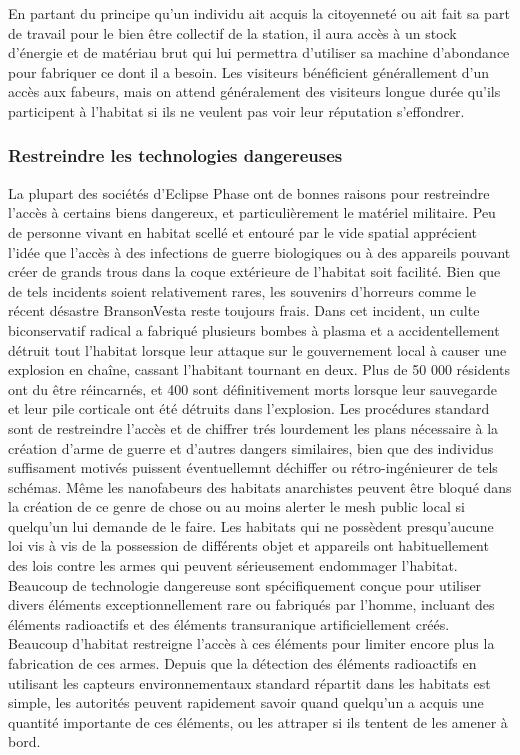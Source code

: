                En partant du principe qu'un individu ait acquis la citoyenneté ou ait fait sa part de travail pour le bien être collectif de la station, il aura accès à un stock d'énergie et de matériau brut qui lui permettra d'utiliser sa machine d'abondance pour fabriquer ce dont il a besoin. Les visiteurs bénéficient générallement d'un accès aux fabeurs, mais on attend généralement des visiteurs longue durée qu'ils participent à l'habitat si ils ne veulent pas voir leur réputation s'effondrer. 

               \subsubsection{Restreindre les technologies dangereuses} \label{sec:restr-dang-techn} 

               La plupart des sociétés d'Eclipse Phase ont de bonnes raisons pour restreindre l'accès à certains biens dangereux, et particulièrement le matériel militaire. Peu de personne vivant en habitat scellé et entouré par le vide spatial apprécient l'idée que l'accès à des infections de guerre biologiques ou à des appareils pouvant créer de grands trous dans la coque extérieure de l'habitat soit facilité. Bien que de tels incidents soient relativement rares, les souvenirs d'horreurs comme le récent désastre BransonVesta reste toujours frais. Dans cet incident, un culte biconservatif radical a fabriqué plusieurs bombes à plasma et a accidentellement détruit tout l'habitat lorsque leur attaque sur le gouvernement local à causer une explosion en chaîne, cassant l'habitant tournant en deux. Plus de 50 000 résidents ont du être réincarnés, et 400 sont définitivement morts lorsque leur sauvegarde et leur pile corticale ont été détruits dans l'explosion. Les procédures standard sont de restreindre l'accès et de chiffrer trés lourdement les plans nécessaire à la création d'arme de guerre et d'autres dangers similaires, bien que des individus suffisament motivés puissent éventuellemnt déchiffer ou rétro-ingénieurer de tels schémas. Même les nanofabeurs des habitats anarchistes peuvent être bloqué dans la création de ce genre de chose ou au moins alerter le mesh public local si quelqu'un lui demande de le faire. Les habitats qui ne possèdent presqu'aucune loi vis à vis de la possession de différents objet et appareils ont habituellement des lois contre les armes qui peuvent sérieusement endommager l'habitat. Beaucoup de technologie dangereuse sont spécifiquement conçue pour utiliser divers éléments exceptionnellement rare ou fabriqués par l'homme, incluant des éléments radioactifs et des éléments transuranique artificiellement créés. Beaucoup d'habitat restreigne l'accès à ces éléments pour limiter encore plus la fabrication de ces armes.  Depuis que la détection des éléments radioactifs en utilisant les capteurs environnementaux standard répartit dans les habitats est simple, les autorités peuvent rapidement savoir quand quelqu'un a acquis une quantité importante de ces éléments, ou les attraper si ils tentent de les amener à bord. 

